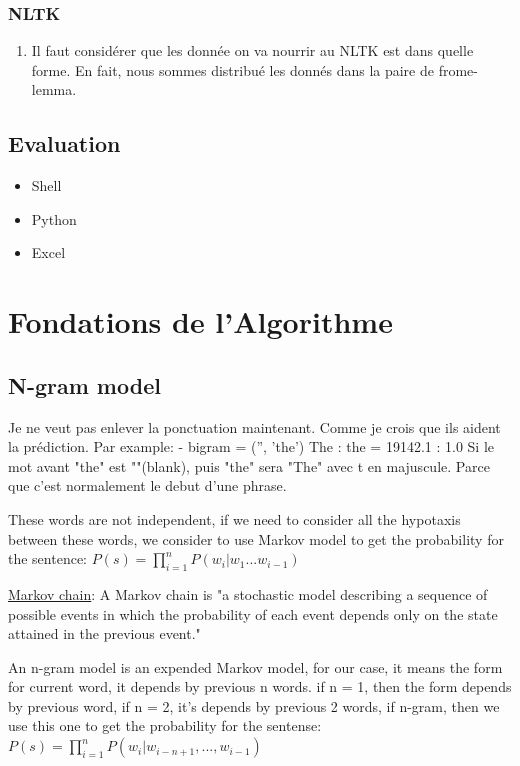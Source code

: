 \documentclass[a4paper]{article}
\begin{document}
\subsubsection{NLTK}
\begin{enumerate}
\item Il faut considérer que les donnée on va nourrir au NLTK est dans quelle forme. En fait, nous sommes distribué les donnés dans la paire de frome-lemma.
\end{enumerate}

\subsection{Evaluation}
\begin{itemize}
\item Shell
\item Python
\item Excel
\end{itemize}

\section{Fondations de l’Algorithme}
\subsection{N-gram model}
Je ne veut pas enlever la ponctuation maintenant. Comme je crois que ils aident la prédiction.  Par example:
- bigram = ('', 'the')       The : the    =  19142.1 : 1.0
Si le mot avant "the" est ""(blank), puis "the" sera "The" avec t en majuscule. Parce que c'est normalement le debut d'une phrase.

These words are not independent, if we need to consider all the hypotaxis between these words, we consider to use Markov model to get the probability for the sentence: $P(s)=\prod\limits_{i=1}^{n}P(w_i|w_1...w_{i-1})$

\href{https://en.wikipedia.org/wiki/Markov_chain}{Markov chain}: A Markov chain is "a stochastic model describing a sequence of possible events in which the probability of each event depends only on the state attained in the previous event."

An n-gram model is an expended Markov model, for our case, it means the form for current word, it depends by previous n words. if n = 1, then the form depends by previous word, if n = 2, it's depends by previous 2 words, if n-gram, then we use this one to get the probability for the sentense: $P(s)=\prod\limits_{i=1}^{n}P(w_i|w_{i-n+1},...,w_{i-1})$
\end{document}
